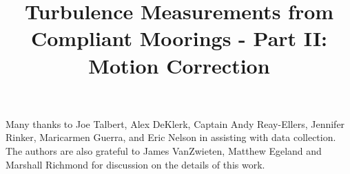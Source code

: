 \documentclass{ametsoc}
\title{Turbulence Measurements from Compliant Moorings - Part II: Motion Correction}
\affiliation{}
\begin{document}
\maketitle













\acknowledgments

Many thanks to Joe Talbert, Alex DeKlerk, Captain Andy Reay-Ellers,  Jennifer Rinker, Maricarmen Guerra, and Eric Nelson in assisting with data collection. The authors are also grateful to James VanZwieten, Matthew Egeland and Marshall Richmond for discussion on the details of this work.

\clearpage %

\appendix






\end{document}
